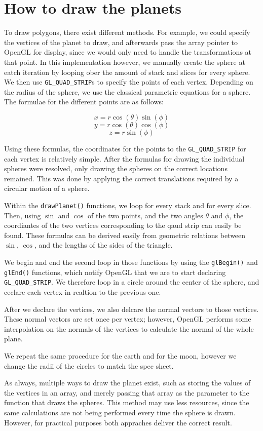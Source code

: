 \documentclass{article}
\begin{document}
\section{How to draw the planets}
To draw polygons, there exist different methods. For example, we could specify the vertices of the planet to draw, and
afterwards pass the array pointer to OpenGL for display, since we would only need to handle the transformations at that
point. In this implementation however, we manually create the sphere at eatch iteration by looping ober the amount of
stack and slices for every sphere. We then use \texttt{GL\_QUAD\_STRIP}s to specify the points of each vertex. Depending
on the radius of the sphere, we use the classical parametric equations for a sphere. The formulae for the different
points are as follows:

\[x = r\cos(\theta)\sin(\phi)\]
\[y = r\cos(\theta)\cos(\phi)\]
\[z = r\sin(\phi)\]

Using these formulas, the coordinates for the points to the \texttt{GL\_QUAD\_STRIP} for each vertex is relatively simple.
After the formulas for drawing the individual spheres were resolved, only drawing the spheres on the correct
locations remained. This was done by applying the correct translations required by a circular motion of a sphere.

Within the \texttt{drawPlanet()} functions, we loop for every stack and for every slice. Then, using $\sin$ and $\cos$ of
the two points, and the two angles $\theta$ and $\phi$, the coordiantes of the two vertices corresponding to the qaud strip
can easily be found. These formulas can be derived easily from geometric relations between $\sin$, $\cos$, and the lengths 
of the sides of the triangle. 

We begin and end the second loop in those functions by using the \texttt{glBegin()} and \texttt{glEnd()} functions, which
notify OpenGL that we are to start declaring \texttt{GL\_QUAD\_STRIP}. We therefore loop in a circle around the center of
the sphere, and ceclare each vertex in realtion to the previous one.

After we declare the vertices, we also delcare the normal vectors to those vertices. These normal vectors are set once 
per vertex; however, OpenGL performs some interpolation on the normals of the vertices to calculate the normal of the 
whole plane.

We repeat the same procedure for the earth and for the moon, however we change the radii of the circles to match the spec
sheet.

As always, multiple ways to draw the planet exist, such as storing the values of the vertices in an array, and merely 
passing that array as the parameter to the function that draws the spheres. This method may use less resources, since
the same calculations are not being performed every time the sphere is drawn. However, for practical purposes both
appraches deliver the correct result.
\end{document}
